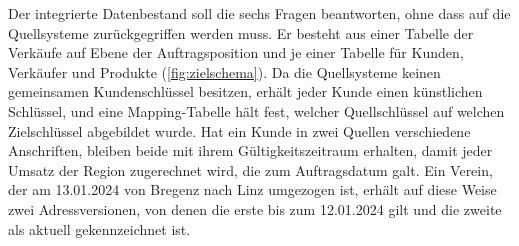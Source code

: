 \documentclass[a4paper,12pt]{article}
\begin{document}
Der integrierte Datenbestand soll die sechs Fragen beantworten, ohne dass auf die Quellsysteme zurückgegriffen werden muss. Er besteht aus einer Tabelle der Verkäufe auf Ebene der Auftragsposition und je einer Tabelle für Kunden, Verkäufer und Produkte (\cref{fig:zielschema}). Da die Quellsysteme keinen gemeinsamen Kundenschlüssel besitzen, erhält jeder Kunde einen künstlichen Schlüssel, und eine Mapping-Tabelle hält fest, welcher Quellschlüssel auf welchen Zielschlüssel abgebildet wurde. Hat ein Kunde in zwei Quellen verschiedene Anschriften, bleiben beide mit ihrem Gültigkeitszeitraum erhalten, damit jeder Umsatz der Region zugerechnet wird, die zum Auftragsdatum galt. Ein Verein, der am 13.01.2024 von Bregenz nach Linz umgezogen ist, erhält auf diese Weise zwei Adressversionen, von denen die erste bis zum 12.01.2024 gilt und die zweite als aktuell gekennzeichnet ist.
\end{document}
